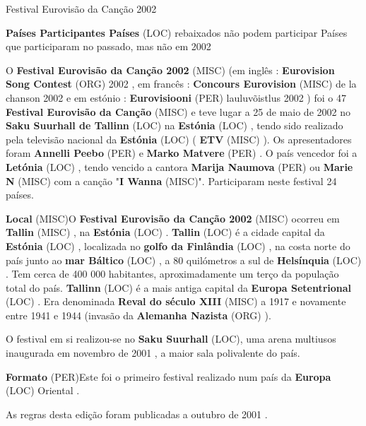 \documentclass[12pt,a4paper]{article}
\begin{document}
Festival Eurovisão da Canção 2002



\textbf{Países Participantes Países} (LOC) rebaixados não podem participar Países que participaram no passado, mas não em 2002

O \textbf{Festival Eurovisão da Canção 2002} (MISC) (em inglês : \textbf{Eurovision Song Contest} (ORG) 2002 , em francês : \textbf{Concours Eurovision} (MISC) de la chanson 2002 e em estónio : \textbf{Eurovisiooni} (PER) lauluvõistlus 2002 ) foi o 47 \textbf{Festival Eurovisão da Canção} (MISC) e teve lugar a 25 de maio de 2002 no \textbf{Saku Suurhall de Tallinn} (LOC) na \textbf{Estónia} (LOC) , tendo sido realizado pela televisão nacional da \textbf{Estónia} (LOC) ( \textbf{ETV} (MISC) ). Os apresentadores foram \textbf{Annelli Peebo} (PER) e \textbf{Marko Matvere} (PER) . O país vencedor foi a \textbf{Letónia} (LOC) , tendo vencido a cantora \textbf{Marija Naumova} (PER) ou \textbf{Marie N} (MISC) com a canção "\textbf{I Wanna} (MISC)". Participaram neste festival 24 países.



\textbf{Local} (MISC)O \textbf{Festival Eurovisão da Canção 2002} (MISC) ocorreu em \textbf{Tallin} (MISC) , na \textbf{Estónia} (LOC) . \textbf{Tallin} (LOC) é a cidade capital da \textbf{Estónia} (LOC) , localizada no \textbf{golfo da Finlândia} (LOC) , na costa norte do país junto ao \textbf{mar Báltico} (LOC) , a 80 quilómetros a sul de \textbf{Helsínquia} (LOC) . Tem cerca de 400 000 habitantes, aproximadamente um terço da população total do país. \textbf{Tallinn} (LOC) é a mais antiga capital da \textbf{Europa Setentrional} (LOC) . Era denominada \textbf{Reval do século XIII} (MISC) a 1917 e novamente entre 1941 e 1944 (invasão da \textbf{Alemanha Nazista} (ORG) ).

O festival em si realizou-se no \textbf{Saku Suurhall} (LOC), uma arena multiusos inaugurada em novembro de 2001 , a maior sala polivalente do país.



\textbf{Formato} (PER)Este foi o primeiro festival realizado num país da \textbf{Europa} (LOC) Oriental .

As regras desta edição foram publicadas a outubro de 2001 .
\end{document}
